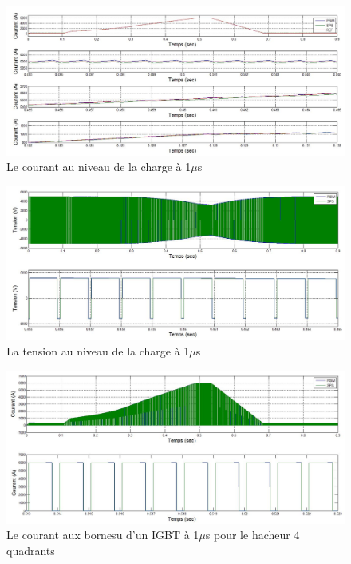 \begin{figure}[htb]
\centering
\includegraphics[scale=0.5]{fig/Hach_AFE/1u/hach_cou_ch.jpg}
\caption{Le courant au niveau de la charge à 1$\mu$s}
\label{AF_HA_CHA1}
\end{figure}



\begin{figure}[htb]
\centering
\includegraphics[scale=0.5]{fig/Hach_AFE/1u/hach_ten_ch.jpg}
\caption{La tension au niveau de la charge à 1$\mu$s}
\label{AF_HA_CHV1}
\end{figure}

\begin{figure}[htb]
\centering
\includegraphics[scale=0.5]{fig/Hach_AFE/1u/IGBT_cou_hach.jpg}
\caption{Le courant aux bornesu d'un IGBT à 1$\mu$s pour le hacheur 4 quadrants}
\label{AF_HA_HAA1}
\end{figure}

